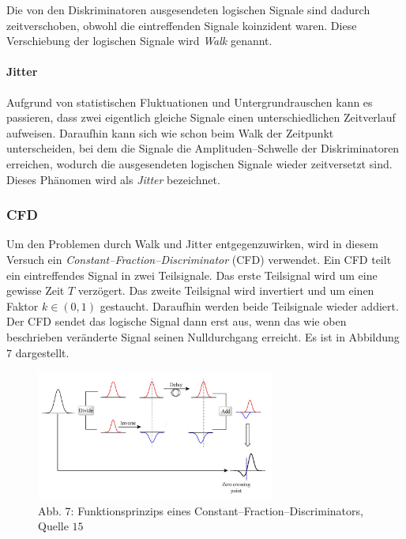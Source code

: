 \documentclass[12pt,a4paper]{scrartcl}
\numberwithin{equation}{section} %
\renewcommand{\[}{} %
\renewcommand{\]}{\noindent} %
\begin{document}
Die von den Diskriminatoren ausgesendeten logischen Signale sind dadurch
zeitverschoben, obwohl die eintreffenden Signale koinzident waren. Diese
Verschiebung der logischen Signale wird \emph{Walk} genannt.

\hypertarget{jitter}{%
\paragraph{Jitter}\label{jitter}}

Aufgrund von statistischen Fluktuationen und Untergrundrauschen kann es
passieren, dass zwei eigentlich gleiche Signale einen unterschiedlichen
Zeitverlauf aufweisen. Daraufhin kann sich wie schon beim Walk der
Zeitpunkt unterscheiden, bei dem die Signale die Amplituden--Schwelle
der Diskriminatoren erreichen, wodurch die ausgesendeten logischen
Signale wieder zeitversetzt sind. Dieses Phänomen wird als \emph{Jitter}
bezeichnet.

\hypertarget{cfd}{%
\subsubsection{CFD}\label{cfd}}

Um den Problemen durch Walk und Jitter entgegenzuwirken, wird in diesem
Versuch ein \emph{Constant--Fraction--Discriminator} (CFD) verwendet.
Ein CFD teilt ein eintreffendes Signal in zwei Teilsignale. Das erste
Teilsignal wird um eine gewisse Zeit \(T\) verzögert. Das zweite
Teilsignal wird invertiert und um einen Faktor \(k\in(0, 1)\) gestaucht.
Daraufhin werden beide Teilsignale wieder addiert. Der CFD sendet das
logische Signal dann erst aus, wenn das wie oben beschrieben veränderte
Signal seinen Nulldurchgang erreicht. Es ist in Abbildung \(7\)
dargestellt.

\begin{figure}
	\centering
	\includegraphics[width=0.7\textwidth]{../media/B3.4/CFD.jpg}
	\caption{Abb. 7: Funktionsprinzips eines Constant--Fraction--Discriminators, Quelle $15$}
	\label{abb:CFD}
\end{figure}
\end{document}
